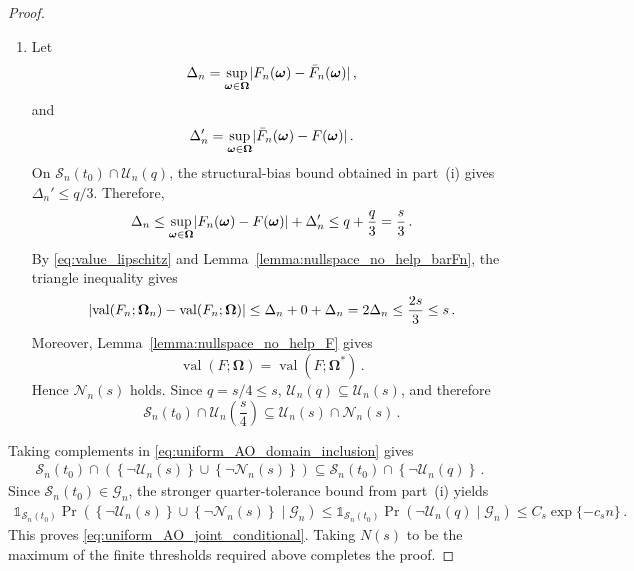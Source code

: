 \documentclass{article}
\makeatletter
\theoremstyle{definition}
\newcommand{\abs}[1]{%
	\ensuremath{%
		\if@display
		\left| #1 \right|
		\else
		\lvert #1 \rvert
		\fi
	}%
}
\newcommand*{\bb}{\boldsymbol}
\makeatother
\begin{document}
\begin{bibunit}
\begin{proof}
\begin{enumerate}[label=(\roman*)]
	\item
	Let
	$$
		\Delta_n
		=
		\underset{\bb\omega\in\bb\Omega}{\sup}
		\abs{
			F_n(\bb\omega)-\bar F_n(\bb\omega)
		}\,,
	$$
	and
	$$
		\Delta_n'
		=
		\underset{\bb\omega\in\bb\Omega}{\sup}
		\abs{
			\bar F_n(\bb\omega)-F(\bb\omega)
		}\,.
	$$
	On
	$\mathcal S_n(t_0)\cap\mathcal U_n(q)$,
	the structural-bias bound obtained in part~(i) gives
	$
		\Delta_n'
		\leq
		q / 3 
	$.
	Therefore,
	$$
	\begin{aligned}
		\Delta_n
		\leq
		\underset{\bb\omega\in\bb\Omega}{\sup}
		\abs{
			F_n(\bb\omega)-F(\bb\omega)
		}
		+
		\Delta_n'\leq
		q+\frac{q}{3}
		=
		\frac{s}{3}\,.
	\end{aligned}
	$$
	By \eqref{eq:value_lipschitz} and
	Lemma~\ref{lemma:nullspace_no_help_barFn}, the triangle inequality gives
	$$
		\abs{
			\operatorname{val}(F_n;\bb\Omega_n)
		-
		\operatorname{val}(F_n;\bb\Omega)
		}
		\leq
		\Delta_n+0+\Delta_n
		=
		2\Delta_n
		\leq
		\frac{2s}{3}
		\leq
		s\,.
	$$
	Moreover, Lemma~\ref{lemma:nullspace_no_help_F} gives
	$$
		\operatorname{val}(F;\bb\Omega)
		=
		\operatorname{val}(F;\bb\Omega^*)\,.
	$$
	Hence $\mathcal N_n(s)$ holds. Since $q=s/4\leq s$,
	$\mathcal U_n(q)\subseteq\mathcal U_n(s)$, and therefore
	$$
		\mathcal S_n(t_0)
		\cap
		\mathcal U_n\left(\frac{s}{4}\right)
		\subseteq
		\mathcal U_n(s)
		\cap
		\mathcal N_n(s)\,.
	$$
	\end{enumerate}
	Taking complements in
	\eqref{eq:uniform_AO_domain_inclusion} gives
	$$
	\begin{aligned}
		\mathcal S_n(t_0)
		\cap
		\left(
			\left\{\lnot\mathcal U_n(s)\right\}
			\cup
			\left\{\lnot\mathcal N_n(s)\right\}
		\right)\subseteq
		\mathcal S_n(t_0)
		\cap
		\left\{
			\lnot\mathcal U_n(q)
		\right\}\,.
	\end{aligned}
	$$
	Since $\mathcal S_n(t_0)\in\mathcal G_n$, the stronger
	quarter-tolerance bound from part~(i) yields
	$$
	\begin{aligned}
		\mathds{1}_{\mathcal S_n(t_0)}
		\Pr\left(
			\left\{\lnot\mathcal U_n(s)\right\}
			\cup
			\left\{\lnot\mathcal N_n(s)\right\}
			\mid
			\mathcal G_n
		\right)\leq
		\mathds{1}_{\mathcal S_n(t_0)}
		\Pr\left(
			\lnot\mathcal U_n(q)
			\mid
			\mathcal G_n
		\right)
		\leq
		C_s\exp\{-c_sn\}\,.
	\end{aligned}
	$$
	This proves \eqref{eq:uniform_AO_joint_conditional}. 
	Taking $N(s)$ to be
	the maximum of the finite thresholds required above completes the
	proof.
\end{proof}




\end{bibunit}
\end{document}
